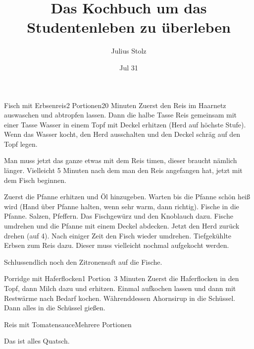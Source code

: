 

\usepackage{cuisine}

\title{Das Kochbuch um das Studentenleben zu überleben}
\author{Julius Stolz}
\date{Jul 31}



\maketitle

\begin{recipe}{Fisch mit Erbsenreis}{2 Portionen}{20 Minuten}
  Zuerst den Reis im Haarnetz auswaschen und abtropfen lassen. Dann die halbe Tasse Reis gemeinsam mit einer Tasse Wasser in einem Topf mit Deckel erhitzen (Herd auf höchste Stufe). Wenn das Wasser kocht, den Herd ausschalten und den Deckel schräg auf den Topf legen.

  Man muss jetzt das ganze etwas mit dem Reis timen, dieser braucht nämlich länger. Vielleicht 5 Minuten nach dem man den Reis angefangen hat, jetzt mit dem Fisch beginnen.

  Zuerst die Pfanne erhitzen und Öl hinzugeben. Warten bis die Pfanne schön heiß wird (Hand über Pfanne halten, wenn sehr warm, dann richtig).
  Fische in die Pfanne. Salzen, Pfeffern. Das Fischgewürz und den Knoblauch dazu. Fische umdrehen und die Pfanne mit einem Deckel abdecken. Jetzt den Herd zurück drehen (auf 4). Nach einiger Zeit den Fisch wieder umdrehen.
  Tiefgekühlte Erbsen zum Reis dazu. Dieser muss vielleicht nochmal aufgekocht werden.
  
  Schlussendlich noch den Zitronensaft auf die Fische.
\end{recipe}

\begin{recipe}{Porridge mit Haferflocken}{1 Portion}{~3 Minuten}
  Zuerst die Haferflocken in den Topf, dann Milch dazu und erhitzen. Einmal aufkochen lassen und dann mit Restwärme nach Bedarf kochen.
  Währenddessen Ahornsirup in die Schüssel. Dann alles in die Schüssel gießen.
\end{recipe}

\begin{recipe}{Reis mit Tomatensauce}{Mehrere Portionen}

\end{recipe}

Das ist alles Quatsch.


